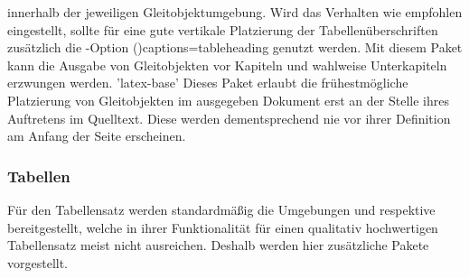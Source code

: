 \begin{DeclarePackages}[Gleitobjekte|?]
  innerhalb der jeweiligen Gleitobjektumgebung. Wird das Verhalten wie 
  empfohlen eingestellt, sollte für eine gute vertikale Platzierung der 
  Tabellenüberschriften zusätzlich die \KOMAScript-Option 
  \Option(){captions=tableheading}
  genutzt werden.
  Mit diesem Paket kann die Ausgabe von Gleitobjekten vor Kapiteln und wahlweise
  Unterkapiteln erzwungen werden.
'latex-base'
  Dieses Paket erlaubt die frühestmögliche Platzierung von Gleitobjekten im 
  ausgegeben Dokument erst an der Stelle ihres Auftretens im Quelltext. Diese 
  werden dementsprechend nie vor ihrer Definition am Anfang der Seite 
  erscheinen.
\end{DeclarePackages}



\subsubsection{%
  Tabellen%
}

Für den Tabellensatz werden standardmäßig die Umgebungen  
und  respektive  bereitgestellt, 
welche in ihrer Funktionalität für einen qualitativ hochwertigen Tabellensatz 
meist nicht ausreichen. Deshalb werden hier zusätzliche Pakete vorgestellt. 

